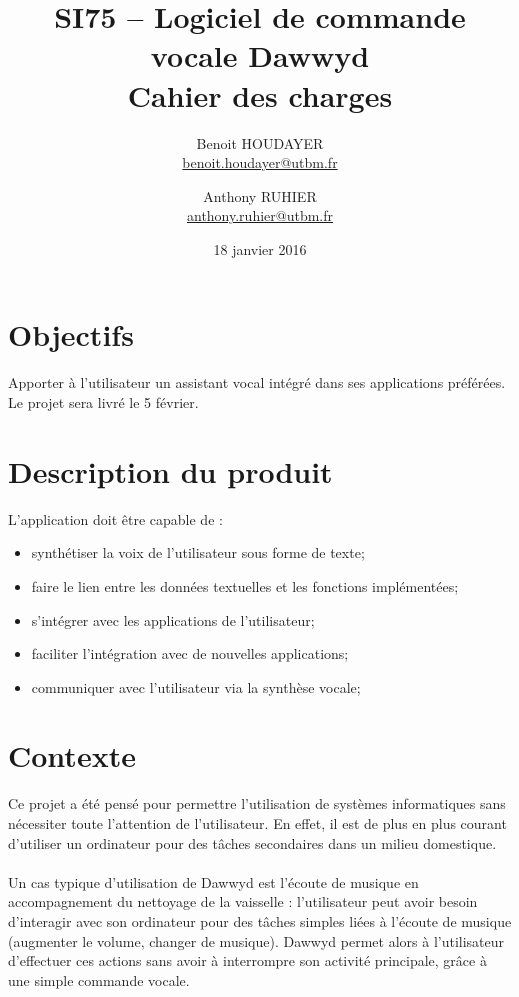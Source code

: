 \documentclass[12pt]{article}
\title{\textbf{SI75 -- Logiciel de commande vocale Dawwyd\\[0.5em]Cahier des charges}}
\author{Benoit HOUDAYER \\ \href{mailto:benoit.houdayer@utbm.fr}{benoit.houdayer@utbm.fr}
\and Anthony RUHIER \\ \href{mailto:anthony.ruhier@utbm.fr}{anthony.ruhier@utbm.fr}}
\date{18 janvier 2016}
\begin{document}
    \maketitle
    \thispagestyle{empty}
    \vspace{4em}
    \tableofcontents

    \afterpage{\cfoot{\thepage}}
    \newpage


	\section{Objectifs}

Apporter à l'utilisateur un assistant vocal intégré dans ses applications
préférées. Le projet sera livré le 5 février.

	\section{Description du produit}

L'application doit être capable de :
\begin{itemize}
    \item synthétiser la voix de l'utilisateur sous forme de texte;
    \item faire le lien entre les données textuelles et les fonctions
        implémentées;
    \item s'intégrer avec les applications de l'utilisateur;
    \item faciliter l'intégration avec de nouvelles applications;
    \item communiquer avec l'utilisateur via la synthèse vocale;
\end{itemize}

    \section{Contexte}

Ce projet a été pensé pour permettre l'utilisation de systèmes informatiques
sans nécessiter toute l'attention de l'utilisateur. En effet, il est de plus en
plus courant d'utiliser un ordinateur pour des tâches secondaires dans un
milieu domestique.

\paragraph{}
Un cas typique d'utilisation de Dawwyd est l'écoute de musique
en accompagnement du nettoyage de la vaisselle : l'utilisateur peut avoir
besoin d'interagir avec son ordinateur pour des tâches simples liées à l'écoute
de musique (augmenter le volume, changer de musique).
Dawwyd permet alors à l'utilisateur d'effectuer ces actions sans avoir à
interrompre son activité principale, grâce à une simple commande vocale.
\end{document}
